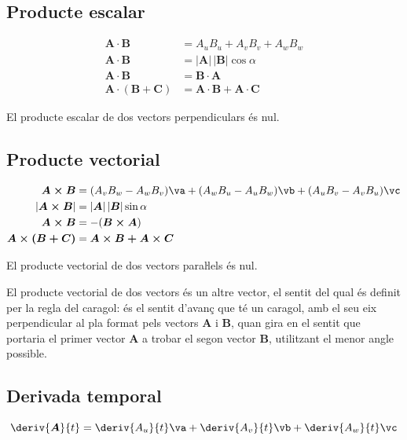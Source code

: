 \documentclass[catalan,a4paper,twoside,11pt]{article}
\begin{document}
\subsection{Producte escalar}
\vspace{-5mm}
\begin{align}
    \boldsymbol{A\cdot B} &= A_u B_u + A_v B_v + A_w B_w\\
    \boldsymbol{A\cdot B} &=|\boldsymbol{A}| \, |\boldsymbol{B}| \cos\alpha\\
    \boldsymbol{A\cdot B} &=\boldsymbol{B\cdot A}\\
    \boldsymbol{A\cdot(B+C)} &= \boldsymbol{A\cdot B+ A\cdot C}
\end{align}

El producte escalar de dos vectors perpendiculars  és nul.

\subsection{Producte vectorial}
\vspace{-5mm}
\begin{align}
    \boldsymbol{A\times B} &= (A_v B_w - A_w B_v)\va + (A_w B_u - A_u B_w)\vb +
    (A_u B_v - A_v B_u)\vc \\
    |\boldsymbol{A\times B}| &=|\boldsymbol{A}| \, |\boldsymbol{B}| \sin\alpha\\
    \boldsymbol{A\times B} &=-(\boldsymbol{B\times A})\\
    \boldsymbol{A\times(B+C)} &= \boldsymbol{A\times B+ A\times C}
\end{align}

El producte vectorial de dos vectors paraŀlels  és nul.

El producte vectorial de dos vectors és un altre vector, el
sentit del qual és definit per la regla del caragol: és el sentit
d'avanç que té un caragol, amb el seu eix perpendicular al
pla format pels vectors  $\boldsymbol{A}$ i $\boldsymbol{B}$, quan
gira en el sentit que portaria el primer vector  $\boldsymbol{A}$ a
trobar el segon vector $\boldsymbol{B}$, utilitzant el menor angle
possible.

\subsection{Derivada temporal}
\begin{equation}
    \deriv{\boldsymbol{A}}{t} = \deriv{A_u}{t}\va +
    \deriv{A_v}{t}\vb + \deriv{A_w}{t}\vc
\end{equation}
\end{document}
